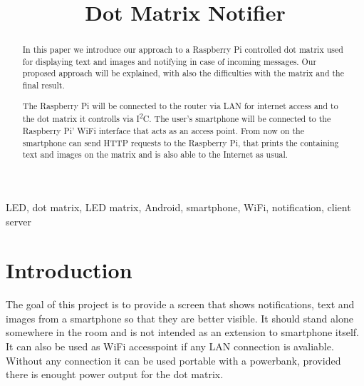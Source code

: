 \documentclass[conference]{IEEEtran}
\begin{document}
\title{Dot Matrix Notifier}

\author{
\and
{}
\and
{}
}

\maketitle

\begin{abstract}
In this paper we introduce our approach to a Raspberry Pi controlled dot matrix used for displaying text and images and notifying in case of incoming messages. Our proposed approach will be explained, with also the difficulties with the matrix and the final result.

The Raspberry Pi will be connected to the router via LAN for internet access and to the dot matrix it controlls via I\textsuperscript{2}C. The user's smartphone will be connected to the Raspberry Pi' WiFi interface that acts as an access point. From now on the smartphone can send HTTP requests to the Raspberry Pi, that prints the containing text and images on the matrix and is also able to the Internet as usual.
\end{abstract}

\begin{IEEEkeywords}
LED, dot matrix, LED matrix, Android, smartphone, WiFi, notification, client server
\end{IEEEkeywords}


\section{Introduction}
The goal of this project is to provide a screen that shows notifications, text and images from a smartphone so that they are better visible. It should stand alone somewhere in the room and is not intended as an extension to smartphone itself. It can also be used as WiFi accesspoint if any LAN connection is avaliable. Without any connection it can be used portable with a powerbank, provided there is enought power output for the dot matrix.
\end{document}
